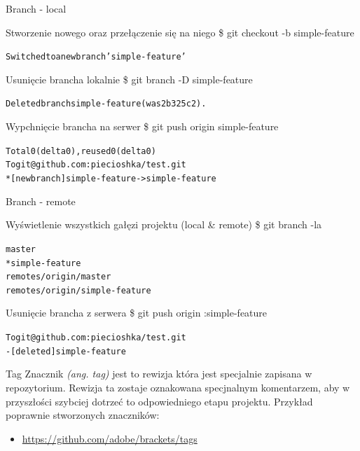 \documentclass{beamer}
\begin{document}
\begin{frame}{Branch - local}
\begin{block}{Stworzenie nowego oraz przełączenie się na niego}
\$ git checkout -b simple-feature
\begin{alltt}
Switched to a new branch 'simple-feature'
\end{alltt}
\end{block}
\begin{block}{Usunięcie brancha lokalnie}
\$ git branch -D simple-feature
\begin{alltt}
Deleted branch simple-feature (was 2b325c2).
\end{alltt}
\end{block}
\begin{block}{Wypchnięcie brancha na serwer}
\$ git push origin simple-feature
\begin{alltt}
Total 0 (delta 0), reused 0 (delta 0) \\
To git@github.com:piecioshka/test.git \\
 * [new branch]      simple-feature -> simple-feature
\end{alltt}
\end{block}
\end{frame}

\begin{frame}{Branch - remote}
\begin{block}{Wyświetlenie wszystkich gałęzi projektu (local \& remote)}
\$ git branch -la
\begin{alltt}
  master \\
* simple-feature \\
  remotes/origin/master \\
  remotes/origin/simple-feature
\end{alltt}
\end{block}
\begin{block}{Usunięcie brancha z serwera}
\$ git push origin :simple-feature
\begin{alltt}
To git@github.com:piecioshka/test.git \\
 - [deleted]         simple-feature
\end{alltt}
\end{block}
\end{frame}

\begin{frame}{Tag}
Znacznik \textit{(ang. tag)} jest to rewizja która jest specjalnie zapisana w repozytorium.
Rewizja ta zostaje oznakowana specjnalnym komentarzem, aby w przyszłości szybciej dotrzeć to odpowiedniego etapu projektu.
\vskip 0.5cm
Przykład poprawnie stworzonych znaczników:
\begin{itemize}
  \item \url{https://github.com/adobe/brackets/tags}
\end{itemize}
\end{frame}
\end{document}
